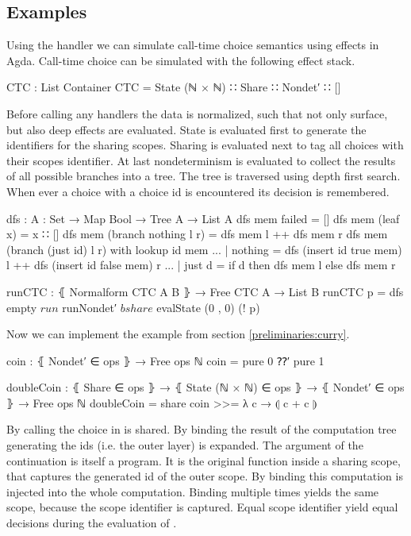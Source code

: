 \subsection{Examples}

Using the handler we can simulate call-time choice semantics using effects in
Agda.
Call-time choice can be simulated with the following effect stack.

\begin{code}
CTC : List Container
CTC = State (ℕ × ℕ) ∷ Share ∷ Nondet′ ∷ []
\end{code}
Before calling any handlers the data is normalized, such that not only surface,
but also deep effects are evaluated.
State is evaluated first to generate the identifiers for the sharing scopes.
Sharing is evaluated next to tag all choices with their scopes identifier.
At last nondeterminism is evaluated to collect the results of all possible
branches into a tree.
The tree is traversed using depth first search.
When ever a choice with a choice id is encountered its decision is remembered.

\begin{code}
dfs : {A : Set} → Map Bool → Tree A → List A
dfs mem failed                   = []
dfs mem (leaf x)                 = x ∷ []
dfs mem (branch nothing    l r)  = dfs mem l ++ dfs mem r
dfs mem (branch (just id)  l r) with lookup id mem
... | nothing  = dfs (insert id true mem) l ++ dfs (insert id false mem) r
... | just d   = if d then dfs mem l else dfs mem r

runCTC : ⦃ Normalform CTC A B ⦄ → Free CTC A → List B
runCTC p = dfs empty $ run $ runNondet′ $ bshare $ evalState (0 , 0) (! p)
\end{code}
Now we can implement the  example from section
\ref{preliminaries:curry}.

\begin{code}
coin : ⦃ Nondet′ ∈ ops ⦄ → Free ops ℕ
coin = pure 0 ⁇′ pure 1

doubleCoin : ⦃ Share ∈ ops ⦄ → ⦃ State (ℕ × ℕ) ∈ ops ⦄ → ⦃ Nondet′ ∈ ops ⦄ →
  Free ops ℕ
doubleCoin = share coin >>= λ c → ⦇ c + c ⦈
\end{code} %
By calling  the choice in  is shared.
By binding the result of  the computation tree generating
the ids (i.e. the outer layer) is expanded.
The argument of the continuation  is itself a program.
It is the original  function inside a sharing scope, that
captures the generated id of the outer scope. %
By binding  this computation is injected into the whole
computation.
Binding  multiple times yields the same scope, because the scope
identifier is captured.
Equal scope identifier yield equal decisions during the evaluation of
.


